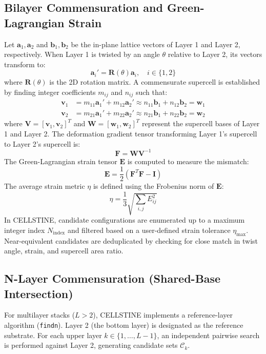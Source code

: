 \documentclass[9pt,a4paper,twoside]{tau-class/tau}
\begin{document}
\subsection{Bilayer Commensuration and Green-Lagrangian Strain}
Let $\mathbf{a}_1, \mathbf{a}_2$ and $\mathbf{b}_1, \mathbf{b}_2$ be the in-plane lattice vectors of Layer 1 and Layer 2, respectively. When Layer 1 is twisted by an angle $\theta$ relative to Layer 2, its vectors transform to:
\begin{equation}
    \mathbf{a}_i' = \mathbf{R}(\theta) \mathbf{a}_i, \quad i \in \{1, 2\}
\end{equation}
where $\mathbf{R}(\theta)$ is the 2D rotation matrix. A commensurate supercell is established by finding integer coefficients $m_{ij}$ and $n_{ij}$ such that:
\begin{align}
    \mathbf{v}_1 &= m_{11} \mathbf{a}_1' + m_{12} \mathbf{a}_2' \approx n_{11} \mathbf{b}_1 + n_{12} \mathbf{b}_2 = \mathbf{w}_1 \\
    \mathbf{v}_2 &= m_{21} \mathbf{a}_1' + m_{22} \mathbf{a}_2' \approx n_{21} \mathbf{b}_1 + n_{22} \mathbf{b}_2 = \mathbf{w}_2
\end{align}
where $\mathbf{V} = [\mathbf{v}_1, \mathbf{v}_2]^T$ and $\mathbf{W} = [\mathbf{w}_1, \mathbf{w}_2]^T$ represent the supercell bases of Layer 1 and Layer 2. The deformation gradient tensor transforming Layer 1's supercell to Layer 2's supercell is:
\begin{equation}
    \mathbf{F} = \mathbf{W}\mathbf{V}^{-1}
\end{equation}
The Green-Lagrangian strain tensor $\mathbf{E}$ is computed to measure the mismatch:
\begin{equation}
    \mathbf{E} = \frac{1}{2} \left( \mathbf{F}^T \mathbf{F} - \mathbf{I} \right)
\end{equation}
The average strain metric $\eta$ is defined using the Frobenius norm of $\mathbf{E}$:
\begin{equation}
    \eta = \frac{1}{3} \sqrt{\sum_{i,j} E_{ij}^2}
\end{equation}
In CELLSTINE, candidate configurations are enumerated up to a maximum integer index $N_{\text{index}}$ and filtered based on a user-defined strain tolerance $\eta_{\text{max}}$. Near-equivalent candidates are deduplicated by checking for close match in twist angle, strain, and supercell area ratio.

\subsection{N-Layer Commensuration (Shared-Base Intersection)}
For multilayer stacks ($L > 2$), CELLSTINE implements a reference-layer algorithm (\texttt{findn}). Layer 2 (the bottom layer) is designated as the reference substrate. For each upper layer $k \in \{1, \dots, L-1\}$, an independent pairwise search is performed against Layer 2, generating candidate sets $\mathcal{C}_k$. 
\end{document}
